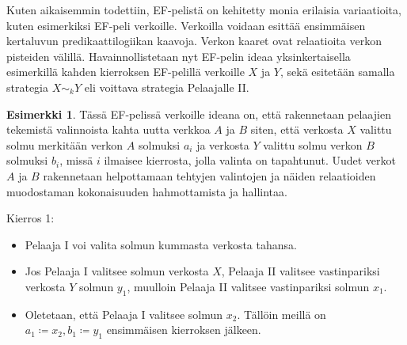\documentclass[finnish]{tktltiki2}
\theoremstyle{definition}
\newtheorem{esim}[lau]{Esimerkki}
\theoremstyle{remark}
\begin{document}
Kuten aikaisemmin todettiin, EF-pelistä on kehitetty monia erilaisia variaatioita, kuten esimerkiksi EF-peli verkoille. Verkoilla voidaan esittää ensimmäisen kertaluvun predikaattilogiikan kaavoja. Verkon kaaret ovat relaatioita verkon pisteiden välillä. Havainnollistetaan nyt EF-pelin ideaa yksinkertaisella esimerkillä kahden kierroksen EF-pelillä verkoille $X$ ja $Y$, sekä esitetään samalla strategia $X \sim_k Y$ eli voittava strategia Pelaajalle II.

\begin{esim}
Tässä EF-pelissä verkoille ideana on, että rakennetaan pelaajien tekemistä valinnoista kahta uutta verkkoa $A$ ja $B$ siten, että verkosta $X$ valittu solmu merkitään verkon $A$ solmuksi $a_i$ ja verkosta $Y$ valittu solmu verkon $B$ solmuksi $b_i$, missä $i$ ilmaisee kierrosta, jolla valinta on tapahtunut. Uudet verkot $A$ ja $B$ rakennetaan helpottamaan tehtyjen valintojen ja näiden relaatioiden muodostaman kokonaisuuden hahmottamista ja hallintaa.

\begin{center}
\end{center}


Kierros 1:
\begin{itemize}
  \item Pelaaja I voi valita solmun kummasta verkosta tahansa.
  \item Jos Pelaaja I valitsee solmun verkosta $X$, Pelaaja II valitsee vastinpariksi verkosta $Y$ solmun $y_1$, muulloin Pelaaja II valitsee vastinpariksi solmun $x_1$.
  \item Oletetaan, että Pelaaja I valitsee solmun $x_2$. Tällöin meillä on $a_1 \coloneqq x_2, b_1 \coloneqq y_1$ ensimmäisen kierroksen jälkeen.
\end{itemize}


\end{esim}
\end{document}
